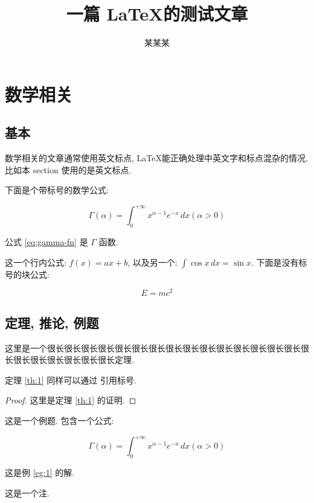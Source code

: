 \documentclass[a4paper, 11pt]{ctexart}
\title{一篇 \LaTeX 的测试文章}
\author{某某某}
\begin{document}
\maketitle
\thispagestyle{empty}

\clearpage

\tableofcontents
\thispagestyle{empty}

\clearpage
\setcounter{page}{1}

\section{数学相关}

\subsection{基本}

数学相关的文章通常使用英文标点, \LaTeX 能正确处理中英文字和标点混杂的情况, 比如本 section 使用的是英文标点.

下面是个带标号的数学公式:

\begin{equation}
    \Gamma(\alpha) = \int_{0}^{+\infty} x^{\alpha - 1} e^{-x} \,dx (\alpha > 0)
    \label{eq:gamma-fn}
\end{equation}

公式 \ref{eq:gamma-fn} 是 $\Gamma$ 函数.

这一个行内公式: $f(x) = ax + b$, 以及另一个: $\int \cos x \,dx = \sin x$. 下面是没有标号的块公式:

$$
    E = mc^2
$$

\subsection{定理, 推论, 例题}

\begin{theorem}
    这里是一个很长很长很长很长很长很长很长很长很长很长很长很长很长很长很长很长很长很长很长很长很长很长定理.
    \label{th:1}
\end{theorem}

定理 \ref{th:1} 同样可以通过 \codeinline{\ref} 引用标号.

\begin{proof}
    这里是定理 \ref{th:1} 的证明.
\end{proof}

\begin{example}
    这是一个例题. 包含一个公式:

    \begin{equation}
        \Gamma(\alpha) = \int_{0}^{+\infty} x^{\alpha - 1} e^{-x} \,dx (\alpha > 0)
    \end{equation}

    \label{eg:1}
\end{example}

\begin{solution}
    这是例 \ref{eg:1} 的解.
\end{solution}

\begin{remark}
    这是一个注.
\end{remark}
\end{document}
